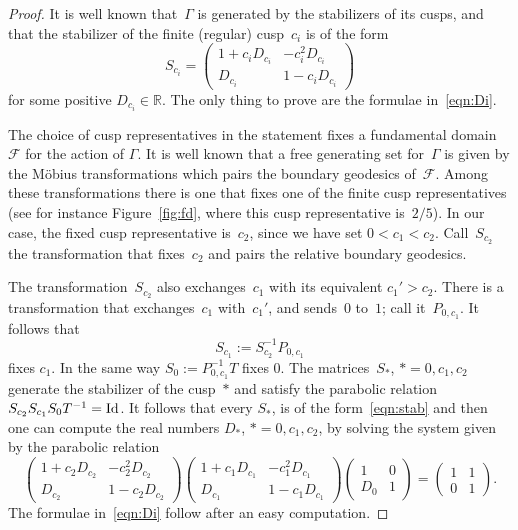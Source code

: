 \documentclass[pdftex]{sigma}
\newcommand{\R}{\mathbb{R}}
\numberwithin{equation}{section}
\begin{document}
\begin{proof}It is well known that~$\Gamma$ is generated by the stabilizers of its cusps, and that the stabilizer of the finite (regular) cusp~$c_i$ is of the form
\begin{equation}\label{eqn:stab}
S_{c_i}=\begin{pmatrix}
1+c_iD_{c_i} & -c_i^2D_{c_i} \\
D_{c_i} & 1-c_iD_{c_i}
\end{pmatrix}
\end{equation}
for some positive $D_{c_i}\in\R$. The only thing to prove are the formulae in~\eqref{eqn:Di}.

The choice of cusp representatives in the statement fixes a fundamental domain $\mathcal{F}$ for the action of $\Gamma$.
It is well known that a free generating set for~$\Gamma$ is given by the M\"obius transformations which pairs the boundary geodesics of~$\mathcal{F}$.
Among these transformations there is one that fixes one of the finite cusp representatives (see for instance Figure~\ref{fig:fd}, where this cusp representative is~$2/5$).
In our case, the fixed cusp representative is~$c_2$, since we have set $0<c_1<c_2$. Call~$S_{c_2}$ the transformation that fixes~$c_2$ and pairs the relative boundary geodesics.

The transformation~$S_{c_2}$ also exchanges~$c_1$ with its equivalent $c_1'>c_2$. There is a transformation that exchanges~$c_1$ with~$c_1'$, and sends~$0$ to~$1$; call it~$P_{0,c_1}$. It follows that
\[
S_{c_1}:=S_{c_2}^{-1}P_{0,c_1}
\]
fixes $c_1$. In the same way $S_{0}:=P_{0,c_1}^{-1}T$ fixes $0$.
The matrices~$S_*$, $*=0,c_1,c_2$ generate the stabilizer of the cusp~$*$ and satisfy the parabolic relation~$S_{c_2}S_{c_1}S_0T^{-1}={\rm Id}$.
It follows that every $S_*$, is of the form~\eqref{eqn:stab} and then one can compute the real numbers $D_*$, $*=0,c_1,c_2$, by solving the system given by the parabolic relation
\[
\begin{pmatrix}
1+c_2D_{c_2} & -c_2^2D_{c_2} \\
D_{c_2} & 1-c_2D_{c_2}
\end{pmatrix}
\begin{pmatrix}
1+c_1D_{c_1} & -c_1^2D_{c_1} \\
D_{c_1} & 1-c_1D_{c_1}
\end{pmatrix}
\begin{pmatrix}
1 & 0 \\
D_0 & 1
\end{pmatrix} =
\begin{pmatrix}
1 & 1 \\
0 & 1
\end{pmatrix}.
\]
The formulae in~\eqref{eqn:Di} follow after an easy computation.
\end{proof}
\end{document}
